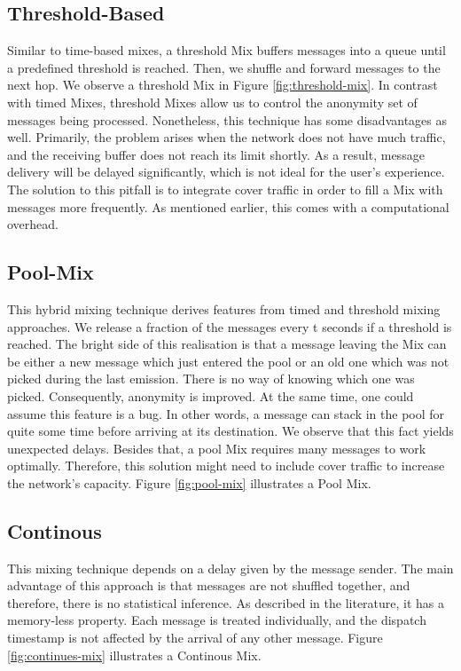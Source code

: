 \documentclass[logo,msc,cyber]{infthesis}   %
\begin{document}
\subsection{Threshold-Based}
Similar to time-based mixes, a threshold Mix buffers messages into a queue until
a predefined threshold is reached. Then, we shuffle and forward messages to the
next hop\cite{diaz2003generalising}. We observe a threshold Mix in Figure
\ref{fig:threshold-mix}. In contrast with timed Mixes, threshold Mixes allow us
to control the anonymity set of messages being processed. Nonetheless, this
technique has some disadvantages as well. Primarily, the problem arises when the
network does not have much traffic, and the receiving buffer does not reach its
limit shortly. As a result, message delivery will be delayed significantly,
which is not ideal for the user's experience. The solution to this pitfall is to
integrate cover traffic in order to fill a Mix with messages more frequently. As
mentioned earlier, this comes with a computational overhead. 


\subsection{Pool-Mix}
This hybrid mixing technique\cite{diaz2003generalising} derives features from
timed and threshold mixing approaches. We release a fraction of the messages
every t seconds if a threshold is reached. The bright side of this realisation
is that a message leaving the Mix can be either a new message which just entered
the pool or an old one which was not picked during the last emission. There is
no way of knowing which one was picked. Consequently, anonymity is improved. At
the same time, one could assume this feature is a bug. In other words, a message
can stack in the pool for quite some time before arriving at its destination. We
observe that this fact yields unexpected delays. Besides that, a pool Mix
requires many messages to work optimally. Therefore, this solution might need to
include cover traffic to increase the network's capacity. Figure
\ref{fig:pool-mix} illustrates a Pool Mix.

\subsection{Continous}
This mixing technique depends on a delay given by the message
sender\cite{kesdogan1998stop}. The main advantage of this approach is that
messages are not shuffled together, and therefore, there is no statistical
inference. As described in the literature, it has a memory-less
property\cite{piotrowska2017loopix}. Each message is treated individually, and
the dispatch timestamp is not affected by the arrival of any other message.
Figure \ref{fig:continues-mix} illustrates a Continous Mix.
\end{document}
